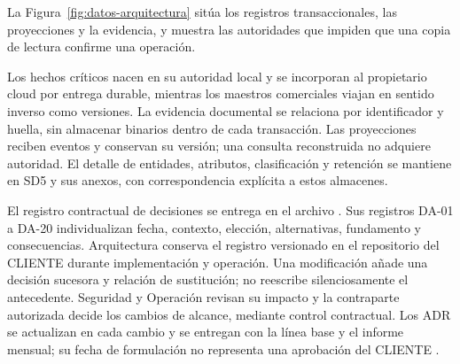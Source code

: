 La Figura~\ref{fig:datos-arquitectura} sitúa los registros transaccionales, las proyecciones y la evidencia, y muestra las autoridades que impiden que una copia de lectura confirme una operación.



Los hechos críticos nacen en su autoridad local y se incorporan al propietario cloud por entrega durable, mientras los maestros comerciales viajan en sentido inverso como versiones. La evidencia documental se relaciona por identificador y huella, sin almacenar binarios dentro de cada transacción. Las proyecciones reciben eventos y conservan su versión; una consulta reconstruida no adquiere autoridad. El detalle de entidades, atributos, clasificación y retención se mantiene en SD5 y sus anexos, con correspondencia explícita a estos almacenes.

El registro contractual de decisiones se entrega en el archivo . Sus registros DA-01 a DA-20 individualizan fecha, contexto, elección, alternativas, fundamento y consecuencias. Arquitectura conserva el registro versionado en el repositorio del CLIENTE durante implementación y operación. Una modificación añade una decisión sucesora y relación de sustitución; no reescribe silenciosamente el antecedente. Seguridad y Operación revisan su impacto y la contraparte autorizada decide los cambios de alcance, mediante control contractual. Los ADR se actualizan en cada cambio y se entregan con la línea base y el informe mensual; su fecha de formulación no representa una aprobación del CLIENTE \parencite[RT-02.04, p.~7]{pucv-transversal}.
